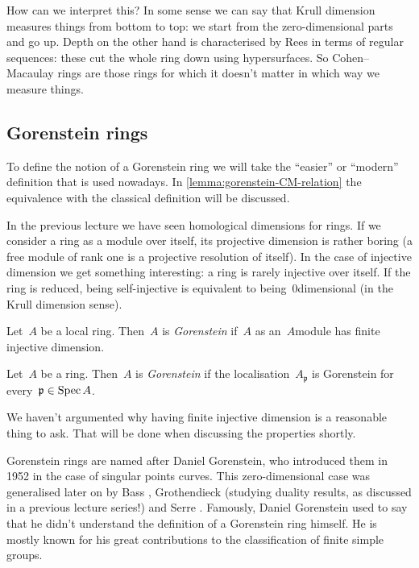 \documentclass[10pt,a4paper]{article}
\begin{document}
How can we interpret this? In some sense we can say that Krull dimension measures things from bottom to top: we start from the zero-dimensional parts and go up. Depth on the other hand is characterised by Rees in terms of regular sequences: these cut the whole ring down using hypersurfaces. So Cohen--Macaulay rings are those rings for which it doesn't matter in which way we measure things.

\subsection{Gorenstein rings}
To define the notion of a Gorenstein ring we will take the ``easier'' or ``modern'' definition that is used nowadays. In \cref{lemma:gorenstein-CM-relation} the equivalence with the classical definition will be discussed.

In the previous lecture we have seen homological dimensions for rings. If we consider a ring as a module over itself, its projective dimension is rather boring (a free module of rank one is a projective resolution of itself). In the case of injective dimension we get something interesting: a ring is rarely injective over itself. If the ring is reduced, being self-injective is equivalent to being~$0$\dash dimensional (in the Krull dimension sense).

\begin{definition}
  Let~$A$ be a local ring. Then~$A$ is \emph{Gorenstein} if~$A$ as an~$A$\dash module has finite injective dimension.
  
  Let~$A$ be a ring. Then~$A$ is \emph{Gorenstein} if the localisation~$A_{\mathfrak{p}}$ is Gorenstein for every~$\mathfrak{p}\in\operatorname{Spec} A$.
\end{definition}

We haven't argumented why having finite injective dimension is a reasonable thing to ask. That will be done when discussing the properties shortly.

\begin{remark}
  Gorenstein rings are named after Daniel Gorenstein, who introduced them in 1952 \cite{gorenstein-arithmetic-theory-adjoint-plane-curves} in the case of singular points curves. This zero-dimensional case was generalised later on by Bass \cite{bass-ubiquity-gorenstein-rings}, Grothendieck \cite{grothendieck-theoremes-de-dualite} (studying duality results, as discussed in a previous lecture series!) and Serre \cite{serre-sur-les-modules-projectifs}. Famously, Daniel Gorenstein used to say that he didn't understand the definition of a Gorenstein ring himself. He is mostly known for his great contributions to the classification of finite simple groups.
\end{remark}
\end{document}
